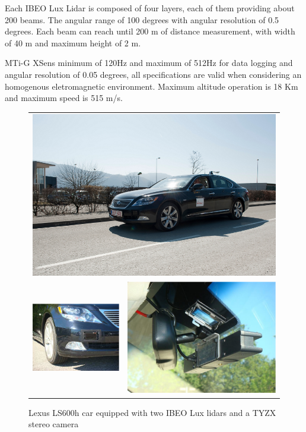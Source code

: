 Each IBEO Lux Lidar is composed of four layers, each of them providing about 200 beams. The angular range of 100 degrees with angular resolution of 0.5 degrees. Each beam can reach until 200 m of distance measurement, with width of 40 m and maximum height of 2 m.

MTi-G XSens minimum of 120Hz and maximum of 512Hz for data logging and angular resolution of 0.05 degrees, all specifications are valid when considering an homogenous eletromagnetic environment. Maximum altitude operation is 18 Km and maximum speed is 515 m/s.

\begin{figure}[H]
   \centering
     \begin{tabular}{lr}
     \multicolumn{2}{c}{ \includegraphics[width=0.55\columnwidth]{img/testbed:car}}\\
       \includegraphics[width=0.42\columnwidth]{img/testbed:ibeo}
       &\includegraphics[width=0.42\columnwidth]{img/testbed:tyzx}
     \end{tabular}
   \caption{Lexus LS600h car equipped with two IBEO Lux lidars and a TYZX
     stereo camera}
   \label{fig:Lexus}
 \end{figure}

